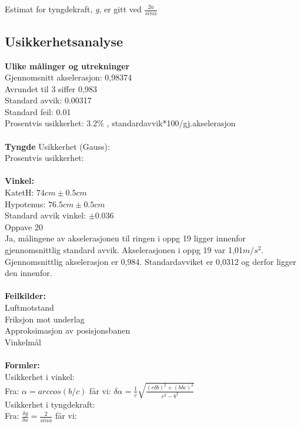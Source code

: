 \documentclass{article}
\begin{document}
Estimat for tyngdekraft, \emph{g}, er gitt ved $\frac{2a}{sin \alpha} $

\vspace{10mm}
\subsection{Usikkerhetsanalyse}
\textbf{Ulike målinger og utrekninger}\\
Gjennomsnitt akselerasjon: 0,98374\\
Avrundet til 3 siffer 0,983\\
Standard avvik: 0.00317\\
Standard feil: 0.01\\
Prosentvis usikkerhet: $3.2\%$ , standardavvik*100/gj.akselerasjon\\
\vspace{2mm}\\
\textbf{Tyngde}
Usikkerhet (Gauss): \\
Prosentvis usikkerhet:\\ 
\vspace{2mm}\\
\textbf{Vinkel:}\\
KatetH: $74cm \pm 0.5cm$\\
Hypotenus: $76.5cm \pm 0.5cm$\\ 
Standard avvik vinkel: $\pm 0.036$\\

Oppave 20\\
Ja, målingene av akselerasjonen til ringen i oppg 19 ligger innenfor gjennomsnittlig standard avvik.
Akselerasjonen i oppg 19 var 1,01$m/s^2$. 
Gjennomsnittlig akselerasjon er 0,984. Standardavviket er 0,0312 og derfor ligger den innenfor. \\
\vspace{5mm}\\
\textbf{Feilkilder:}\\
Luftmotstand\\
Friksjon mot underlag\\
Approksimasjon av posisjonsbanen\\
Vinkelmål\\
\vspace{3mm}\\
\textbf{Formler:}\\
Usikkerhet i vinkel:\\
Fra: $\alpha = arccos(b/c)$
får vi: $\delta\alpha = \frac{1}{c}\sqrt{\frac{(c\delta b)^2+(b\delta c)^2}{c^2-b^2}}$\\
Usikkerhet i tyngdekraft:\\
Fra: $\frac{\delta g}{\delta a} = \frac{2}{sin \alpha}$
får vi: 
\end{document}
